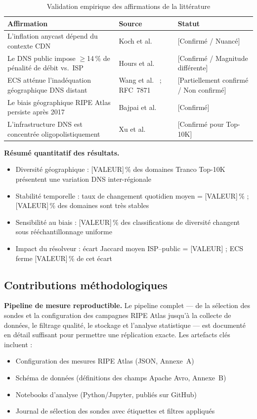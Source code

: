 \begin{table}[H]
\centering
\small
\begin{tabularx}{\linewidth}{X p{3.5cm} p{3cm}}
\toprule
\textbf{Affirmation} & \textbf{Source} & \textbf{Statut} \\
\midrule
L'inflation anycast dépend du contexte CDN & Koch et al.~\cite{Koch2021} & [Confirmé / Nuancé] \\
Le DNS public impose $\geq$14\,\% de pénalité de débit vs.\ ISP & Hours et al.~\cite{Hours2016} & [Confirmé / Magnitude différente] \\
ECS atténue l'inadéquation géographique DNS distant & Wang et al.~\cite{Wang2018} ; RFC~7871~\cite{RFC7871} & [Partiellement confirmé / Non confirmé] \\
Le biais géographique RIPE Atlas persiste après 2017 & Bajpai et al.~\cite{Bajpai2017} & [Confirmé] \\
L'infrastructure DNS est concentrée oligopolistiquement & Xu et al.~\cite{Xu2023} & [Confirmé pour Top-10K] \\
\bottomrule
\end{tabularx}
\caption{Validation empirique des affirmations de la littérature}
\label{tab:hypothesis_validation}
\end{table}

\textbf{Résumé quantitatif des résultats.}
\begin{itemize}
  \item Diversité géographique : [VALEUR]\,\% des domaines Tranco Top-10K présentent une variation DNS inter-régionale
  \item Stabilité temporelle : taux de changement quotidien moyen = [VALEUR]\,\% ; [VALEUR]\,\% des domaines sont très stables
  \item Sensibilité au biais : [VALEUR]\,\% des classifications de diversité changent sous rééchantillonnage uniforme
  \item Impact du résolveur : écart Jaccard moyen ISP--public = [VALEUR] ; ECS ferme [VALEUR]\,\% de cet écart
\end{itemize}
\bigskip
\subsection{Contributions méthodologiques}
\label{subsec:5.3.2}

\textbf{Pipeline de mesure reproductible.}
Le pipeline complet --- de la sélection des sondes et la configuration des campagnes RIPE Atlas jusqu'à la collecte de données, le filtrage qualité, le stockage et l'analyse statistique --- est documenté en détail suffisant pour permettre une réplication exacte. Les artefacts clés incluent :
\begin{itemize}
  \item Configuration des mesures RIPE Atlas (JSON, Annexe~A)
  \item Schéma de données (définitions des champs Apache Avro, Annexe~B)
  \item Notebooks d'analyse (Python/Jupyter, publiés sur GitHub)
  \item Journal de sélection des sondes avec étiquettes et filtres appliqués
\end{itemize}

